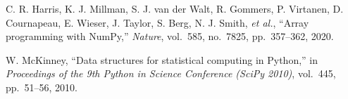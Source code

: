 \documentclass[journal,article,submit,pdftex,moreauthors]{Definitions/mdpi}
\begin{document}
C. R. Harris, K. J. Millman, S. J. van der Walt, R. Gommers, P. Virtanen, D. Cournapeau, E. Wieser, J. Taylor, S. Berg, N. J. Smith, \textit{et al.}, ``Array programming with NumPy,'' \textit{Nature}, vol.~585, no.~7825, pp.~357--362, 2020.

W. McKinney, ``Data structures for statistical computing in Python,'' in \textit{Proceedings of the 9th Python in Science Conference (SciPy 2010)}, vol.~445, pp.~51--56, 2010.


%


\PublishersNote{}
\end{document}
